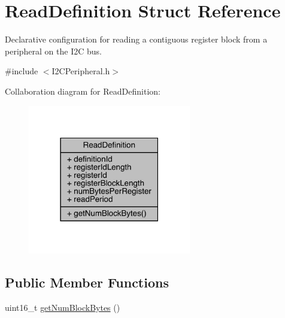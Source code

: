 \hypertarget{struct_read_definition}{}\section{Read\+Definition Struct Reference}
\label{struct_read_definition}


Declarative configuration for reading a contiguous register block from a peripheral on the I2C bus.  




{\ttfamily \#include $<$I2\+C\+Peripheral.\+h$>$}



Collaboration diagram for Read\+Definition\+:\nopagebreak
\begin{figure}[H]
\begin{center}
\leavevmode
\includegraphics[width=202pt]{struct_read_definition__coll__graph}
\end{center}
\end{figure}
\subsection*{Public Member Functions}
\begin{DoxyCompactItemize}
\item 
uint16\+\_\+t \mbox{\hyperlink{struct_read_definition_a0cd8f09fd884f9d1f3c8638fafd47c82}{get\+Num\+Block\+Bytes}} ()
\end{DoxyCompactItemize}
